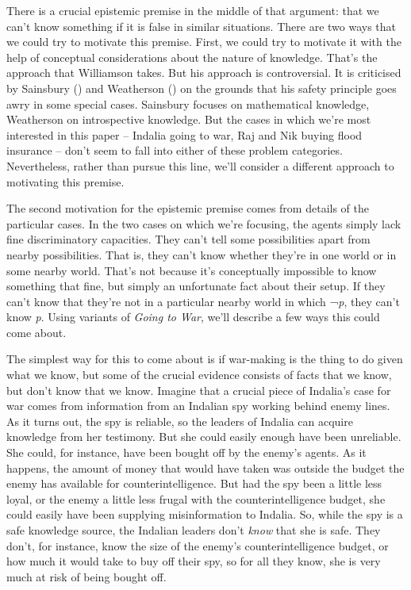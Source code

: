 \documentclass[
  10pt,
  letterpaper,
  DIV=11,
  numbers=noendperiod,
  twoside]{scrartcl}
\begin{document}
There is a crucial epistemic premise in the middle of that argument:
that we can't know something if it is false in similar situations. There
are two ways that we could try to motivate this premise. First, we could
try to motivate it with the help of conceptual considerations about the
nature of knowledge. That's the approach that Williamson takes. But his
approach is controversial. It is criticised by Sainsbury
() and Weatherson
() on the grounds that his
safety principle goes awry in some special cases. Sainsbury focuses on
mathematical knowledge, Weatherson on introspective knowledge. But the
cases in which we're most interested in this paper -- Indalia going to
war, Raj and Nik buying flood insurance -- don't seem to fall into
either of these problem categories. Nevertheless, rather than pursue
this line, we'll consider a different approach to motivating this
premise.

The second motivation for the epistemic premise comes from details of
the particular cases. In the two cases on which we're focusing, the
agents simply lack fine discriminatory capacities. They can't tell some
possibilities apart from nearby possibilities. That is, they can't know
whether they're in one world or in some nearby world. That's not because
it's conceptually impossible to know something that fine, but simply an
unfortunate fact about their setup. If they can't know that they're not
in a particular nearby world in which ¬\emph{p}, they can't know
\emph{p}. Using variants of \emph{Going to War}, we'll describe a few
ways this could come about.

The simplest way for this to come about is if war-making is the thing to
do given what we know, but some of the crucial evidence consists of
facts that we know, but don't know that we know. Imagine that a crucial
piece of Indalia's case for war comes from information from an Indalian
spy working behind enemy lines. As it turns out, the spy is reliable, so
the leaders of Indalia can acquire knowledge from her testimony. But she
could easily enough have been unreliable. She could, for instance, have
been bought off by the enemy's agents. As it happens, the amount of
money that would have taken was outside the budget the enemy has
available for counterintelligence. But had the spy been a little less
loyal, or the enemy a little less frugal with the counterintelligence
budget, she could easily have been supplying misinformation to Indalia.
So, while the spy is a safe knowledge source, the Indalian leaders don't
\emph{know} that she is safe. They don't, for instance, know the size of
the enemy's counterintelligence budget, or how much it would take to buy
off their spy, so for all they know, she is very much at risk of being
bought off.
\end{document}
